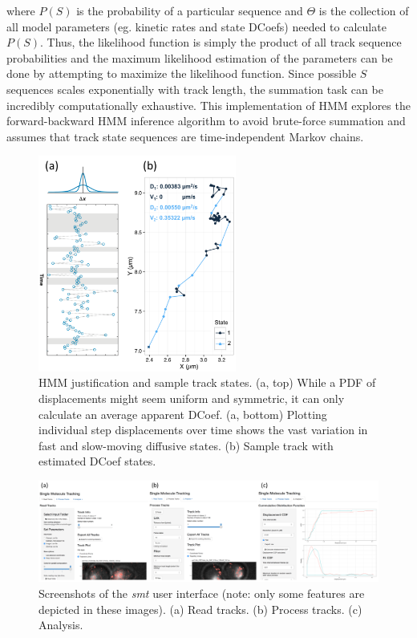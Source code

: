 \documentclass{bioinfo}
\begin{document}
where $P(S)$ is the probability of a particular sequence and $\Theta$ is the collection of all model parameters (eg. kinetic rates and state DCoefs) needed to calculate $P(S)$. Thus, the likelihood function is simply the product of all track sequence probabilities and the maximum likelihood estimation of the parameters can be done by attempting to maximize the likelihood function. Since possible $S$ sequences scales exponentially with track length, the summation task can be incredibly computationally exhaustive. This implementation of HMM explores the forward-backward HMM inference algorithm to avoid brute-force summation and assumes that track state sequences are time-independent Markov chains.

\begin{figure}[!tpb]
\centerline{\includegraphics[width=65mm]{hmm.png}}
\caption{HMM justification and sample track states. (a, top) While a PDF of displacements might seem uniform and symmetric, it can only calculate an average apparent DCoef. (a, bottom) Plotting individual step displacements over time shows the vast variation in fast and slow-moving diffusive states. (b) Sample track with estimated DCoef states.}\label{fig:10}
\end{figure}

\begin{figure}[!tpb]
\centerline{\includegraphics[width=175mm]{gui.png}}
\caption{Screenshots of the \textit{smt} user interface (note: only some features are depicted in these images). (a) Read tracks. (b) Process tracks. (c) Analysis. }\label{fig:11}
\end{figure}
\end{document}
